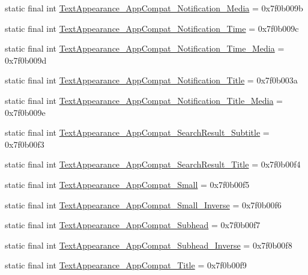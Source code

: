 \begin{CompactItemize}
static final int \hyperlink{classandroid_1_1support_1_1v7_1_1palette_1_1_r_1_1style_d8ef48acb8a796418d5c40b788e18bc9}{TextAppearance\_\-AppCompat\_\-Notification\_\-Media} = 0x7f0b009b
\item 
static final int \hyperlink{classandroid_1_1support_1_1v7_1_1palette_1_1_r_1_1style_c5d04eb85ccb0b17d1170b44ac35ea5b}{TextAppearance\_\-AppCompat\_\-Notification\_\-Time} = 0x7f0b009c
\item 
static final int \hyperlink{classandroid_1_1support_1_1v7_1_1palette_1_1_r_1_1style_956014cf39baab2fe0ff59942be7cd3b}{TextAppearance\_\-AppCompat\_\-Notification\_\-Time\_\-Media} = 0x7f0b009d
\item 
static final int \hyperlink{classandroid_1_1support_1_1v7_1_1palette_1_1_r_1_1style_44c85905090695661c46f28617ff5ea5}{TextAppearance\_\-AppCompat\_\-Notification\_\-Title} = 0x7f0b003a
\item 
static final int \hyperlink{classandroid_1_1support_1_1v7_1_1palette_1_1_r_1_1style_6b88f3e0eaa32141ddf783abab71afc2}{TextAppearance\_\-AppCompat\_\-Notification\_\-Title\_\-Media} = 0x7f0b009e
\item 
static final int \hyperlink{classandroid_1_1support_1_1v7_1_1palette_1_1_r_1_1style_ddb2ac8ac917919fcfe8aad6ebb78766}{TextAppearance\_\-AppCompat\_\-SearchResult\_\-Subtitle} = 0x7f0b00f3
\item 
static final int \hyperlink{classandroid_1_1support_1_1v7_1_1palette_1_1_r_1_1style_d3203ca1411e23353f70b9dea4e55785}{TextAppearance\_\-AppCompat\_\-SearchResult\_\-Title} = 0x7f0b00f4
\item 
static final int \hyperlink{classandroid_1_1support_1_1v7_1_1palette_1_1_r_1_1style_05e7f25525615f38612e4db9ef1f1d58}{TextAppearance\_\-AppCompat\_\-Small} = 0x7f0b00f5
\item 
static final int \hyperlink{classandroid_1_1support_1_1v7_1_1palette_1_1_r_1_1style_bf93fbaf3f0e305e21ccb2a957271ad5}{TextAppearance\_\-AppCompat\_\-Small\_\-Inverse} = 0x7f0b00f6
\item 
static final int \hyperlink{classandroid_1_1support_1_1v7_1_1palette_1_1_r_1_1style_afeed5c63db6de54d74d8bf0dcf0039b}{TextAppearance\_\-AppCompat\_\-Subhead} = 0x7f0b00f7
\item 
static final int \hyperlink{classandroid_1_1support_1_1v7_1_1palette_1_1_r_1_1style_e0d416b2fcfad2367aec1afb31e7d6d7}{TextAppearance\_\-AppCompat\_\-Subhead\_\-Inverse} = 0x7f0b00f8
\item 
static final int \hyperlink{classandroid_1_1support_1_1v7_1_1palette_1_1_r_1_1style_42df5ede345bc4d8fbf7cd5da887cb31}{TextAppearance\_\-AppCompat\_\-Title} = 0x7f0b00f9

\end{CompactItemize}
